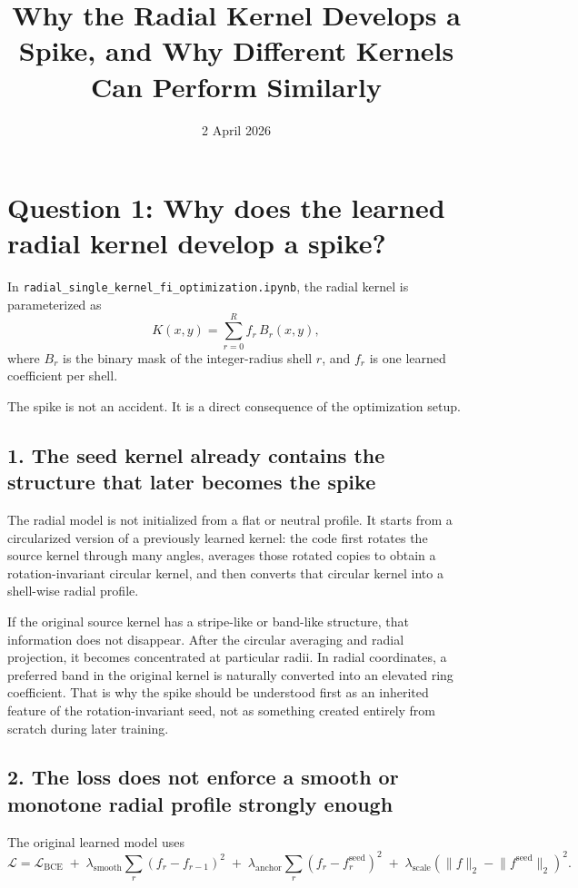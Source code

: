 \documentclass{article}
\begin{document}
\title{Why the Radial Kernel Develops a Spike, and Why Different Kernels Can Perform Similarly}
\author{}
\date{2 April 2026}
\maketitle
\footnotesize
\setlength{\parindent}{0pt}

\section*{Question 1: Why does the learned radial kernel develop a spike?}

In \texttt{radial\_single\_kernel\_fi\_optimization.ipynb}, the radial kernel is parameterized as
\[
K(x,y)=\sum_{r=0}^{R} f_r\,B_r(x,y),
\]
where \(B_r\) is the binary mask of the integer-radius shell \(r\), and \(f_r\) is one learned coefficient per shell.

The spike is not an accident. It is a direct consequence of the optimization setup.

\subsection*{1. The seed kernel already contains the structure that later becomes the spike}
The radial model is not initialized from a flat or neutral profile. It starts from a circularized version of a previously learned kernel: the code first rotates the source kernel through many angles, averages those rotated copies to obtain a rotation-invariant circular kernel, and then converts that circular kernel into a shell-wise radial profile.

If the original source kernel has a stripe-like or band-like structure, that information does not disappear. After the circular averaging and radial projection, it becomes concentrated at particular radii. In radial coordinates, a preferred band in the original kernel is naturally converted into an elevated ring coefficient. That is why the spike should be understood first as an inherited feature of the rotation-invariant seed, not as something created entirely from scratch during later training.

\subsection*{2. The loss does not enforce a smooth or monotone radial profile strongly enough}
The original learned model uses
\[
\mathcal{L}
=
\mathcal{L}_{\mathrm{BCE}}
\;+\;
\lambda_{\mathrm{smooth}}\sum_r (f_r-f_{r-1})^2
\;+\;
\lambda_{\mathrm{anchor}}\sum_r (f_r-f_r^{\mathrm{seed}})^2
\;+\;
\lambda_{\mathrm{scale}}\left(\lVert f\rVert_2-\lVert f^{\mathrm{seed}}\rVert_2\right)^2.
\]
\end{document}
